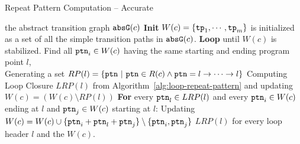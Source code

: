 \begin{algorithm}
  \caption{
{Repeat Pattern Computation -- Accurate}
\label{alg:repeat-pattern-complete}
}
\begin{algorithmic}[1]
\REQUIRE the abstract transition graph $\mathtt{abs}{\mathtt{G}}(c)$
\STATE  \textbf{Init} $W(c) = \{\mathtt{tp}_1, \cdots, \mathtt{tp}_m\}$ is initialized as a set of all the simple transition paths in $\mathtt{abs}{\mathtt{G}}(c)$.
\STATE  \textbf{Loop} until $W(c)$ is stabilized.
\STATE    \quad Find all $\mathtt{ptn}_i \in W(c)$ having the same starting and ending program point $l$,
      \\  \quad \quad Generating a set $RP(l) = \{\mathtt{ptn} ~|~ \mathtt{ptn} \in R(c) \land \mathtt{ptn} = l \to \cdots \to l\}$
      \STATE    \quad \quad Computing Loop Closure $LRP(l)$ from Algorithm~\ref{alg:loop-repeat-pattern} and updating $W(c) = (W(c) \setminus RP(l))$
\STATE    \quad \quad \textbf{For} every $\mathtt{ptn}_l \in LRP(l)$ and every  $\mathtt{ptn}_i \in W(c)$ ending at $l$ and $\mathtt{ptn}_j \in W(c)$ starting at $l$:
\STATE  \quad \quad \quad  Updating $W(c) = W(c) \cup \{\mathtt{ptn}_i + \mathtt{ptn}_l + \mathtt{ptn}_j\} \setminus \{\mathtt{ptn}_i, \mathtt{ptn}_j\}$ 
\RETURN $LRP(l)$ for every loop header $l$ and the $W(c)$.
\end{algorithmic}
\end{algorithm}
%
